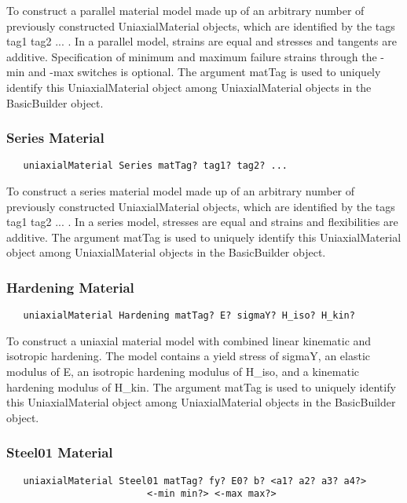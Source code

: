 \documentclass[12pt]{article}
\begin{document}
\noindent To construct a parallel material model made up of an
arbitrary number of previously constructed UniaxialMaterial objects, 
which are identified by the tags tag1 tag2 ... . In a parallel model,
strains are equal and stresses and tangents are additive. Specification of
minimum and maximum failure strains through the -min and -max switches
is optional. The argument matTag is used to
uniquely identify this UniaxialMaterial object among UniaxialMaterial objects
in the BasicBuilder object.

\subsubsection{Series Material}
{\sf\small
\begin{verbatim}
   uniaxialMaterial Series matTag? tag1? tag2? ... 
\end{verbatim}
}

\noindent To construct a series material model made up of an
arbitrary number of previously constructed UniaxialMaterial objects, 
which are identified by the tags tag1 tag2 ... . In a series model,
stresses are equal and strains and flexibilities are additive. The argument matTag 
is used to uniquely identify this UniaxialMaterial object among UniaxialMaterial objects
in the BasicBuilder object.

\subsubsection{Hardening Material}
{\sf\small
\begin{verbatim}
   uniaxialMaterial Hardening matTag? E? sigmaY? H_iso? H_kin?
\end{verbatim}
}

\noindent To construct a uniaxial material model with combined linear kinematic
and isotropic hardening. The model contains a yield stress of sigmaY, an
elastic modulus of E, an isotropic hardening modulus of H\_iso, and a
kinematic hardening modulus of H\_kin. The argument matTag is used to 
uniquely identify this UniaxialMaterial object among UniaxialMaterial objects
in the BasicBuilder object.

\subsubsection{Steel01 Material}
{\sf\small
\begin{verbatim}
   uniaxialMaterial Steel01 matTag? fy? E0? b? <a1? a2? a3? a4?> 
                         <-min min?> <-max max?>
\end{verbatim}
}
\end{document}

